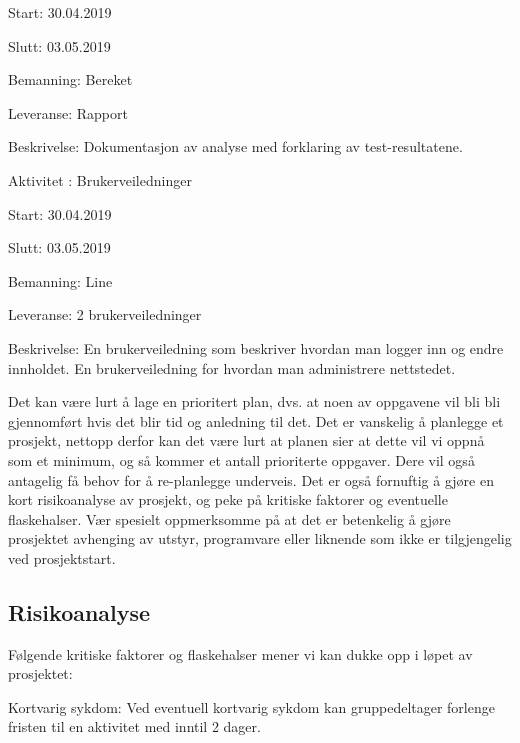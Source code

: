 \documentclass[11pt,a4paper]{report}
\begin{document}
\begin{compactdesc}
\begin{compactitem}
	\item Start: 30.04.2019
	\item Slutt: 03.05.2019
	\item Bemanning: Bereket
	\item Leveranse: Rapport
	\item Beskrivelse: Dokumentasjon av analyse med forklaring av test-resultatene.
	\addtocounter{aktivitetTeller}{1}
	\end{compactitem}
	\item [Aktivitet \arabic{aktivitetTeller}:] Brukerveiledninger
	\begin{compactitem}
	\item Start: 30.04.2019
	\item Slutt: 03.05.2019
	\item Bemanning: Line
	\item Leveranse: 2 brukerveiledninger
	\item Beskrivelse: En brukerveiledning som beskriver hvordan man logger inn og endre innholdet. En brukerveiledning for hvordan man administrere nettstedet.
	\addtocounter{aktivitetTeller}{1}
	\end{compactitem}

\end{compactdesc}

\smallskip

Det kan være lurt å lage en prioritert plan, dvs. at noen av oppgavene vil bli bli gjennomført hvis det blir tid og anledning til det. Det er vanskelig å planlegge et prosjekt, nettopp derfor kan det være lurt at planen sier at dette vil vi oppnå som et minimum, og så kommer et antall prioriterte oppgaver. Dere vil også antagelig få behov for å re-planlegge underveis.  Det er også fornuftig å gjøre en kort risikoanalyse av prosjekt, og peke på kritiske faktorer og eventuelle flaskehalser. Vær spesielt oppmerksomme på at det er betenkelig å gjøre prosjektet avhenging av utstyr, programvare eller liknende som ikke er tilgjengelig ved prosjektstart.

\subsection*{Risikoanalyse}

Følgende kritiske faktorer og flaskehalser mener vi kan dukke opp i løpet av prosjektet:

Kortvarig sykdom: Ved eventuell kortvarig sykdom kan gruppedeltager forlenge fristen til en aktivitet med inntil 2 dager. 
\end{document}
